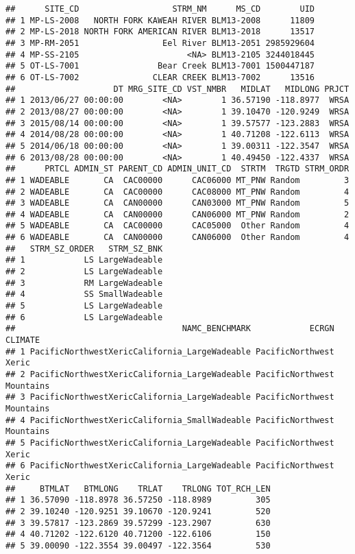 \documentclass[]{article}
\begin{document}
\begin{verbatim}
##      SITE_CD                   STRM_NM      MS_CD        UID
## 1 MP-LS-2008   NORTH FORK KAWEAH RIVER BLM13-2008      11809
## 2 MP-LS-2018 NORTH FORK AMERICAN RIVER BLM13-2018      13517
## 3 MP-RM-2051                 Eel River BLM13-2051 2985929604
## 4 MP-SS-2105                      <NA> BLM13-2105 3244018445
## 5 OT-LS-7001                Bear Creek BLM13-7001 1500447187
## 6 OT-LS-7002               CLEAR CREEK BLM13-7002      13516
##                    DT MRG_SITE_CD VST_NMBR   MIDLAT   MIDLONG PRJCT
## 1 2013/06/27 00:00:00        <NA>        1 36.57190 -118.8977  WRSA
## 2 2013/08/27 00:00:00        <NA>        1 39.10470 -120.9249  WRSA
## 3 2015/08/14 00:00:00        <NA>        1 39.57577 -123.2883  WRSA
## 4 2014/08/28 00:00:00        <NA>        1 40.71208 -122.6113  WRSA
## 5 2014/06/18 00:00:00        <NA>        1 39.00311 -122.3547  WRSA
## 6 2013/08/28 00:00:00        <NA>        1 40.49450 -122.4337  WRSA
##      PRTCL ADMIN_ST PARENT_CD ADMIN_UNIT_CD  STRTM  TRGTD STRM_ORDR
## 1 WADEABLE       CA  CAC00000      CAC06000 MT_PNW Random         3
## 2 WADEABLE       CA  CAC00000      CAC08000 MT_PNW Random         4
## 3 WADEABLE       CA  CAN00000      CAN03000 MT_PNW Random         5
## 4 WADEABLE       CA  CAN00000      CAN06000 MT_PNW Random         2
## 5 WADEABLE       CA  CAC00000      CAC05000  Other Random         4
## 6 WADEABLE       CA  CAN00000      CAN06000  Other Random         4
##   STRM_SZ_ORDER   STRM_SZ_BNK
## 1            LS LargeWadeable
## 2            LS LargeWadeable
## 3            RM LargeWadeable
## 4            SS SmallWadeable
## 5            LS LargeWadeable
## 6            LS LargeWadeable
##                                  NAMC_BENCHMARK            ECRGN   CLIMATE
## 1 PacificNorthwestXericCalifornia_LargeWadeable PacificNorthwest     Xeric
## 2 PacificNorthwestXericCalifornia_LargeWadeable PacificNorthwest Mountains
## 3 PacificNorthwestXericCalifornia_LargeWadeable PacificNorthwest Mountains
## 4 PacificNorthwestXericCalifornia_SmallWadeable PacificNorthwest Mountains
## 5 PacificNorthwestXericCalifornia_LargeWadeable PacificNorthwest     Xeric
## 6 PacificNorthwestXericCalifornia_LargeWadeable PacificNorthwest     Xeric
##     BTMLAT   BTMLONG    TRLAT    TRLONG TOT_RCH_LEN
## 1 36.57090 -118.8978 36.57250 -118.8989         305
## 2 39.10240 -120.9251 39.10670 -120.9241         520
## 3 39.57817 -123.2869 39.57299 -123.2907         630
## 4 40.71202 -122.6120 40.71200 -122.6106         150
## 5 39.00090 -122.3554 39.00497 -122.3564         530

\end{verbatim}
\end{document}
